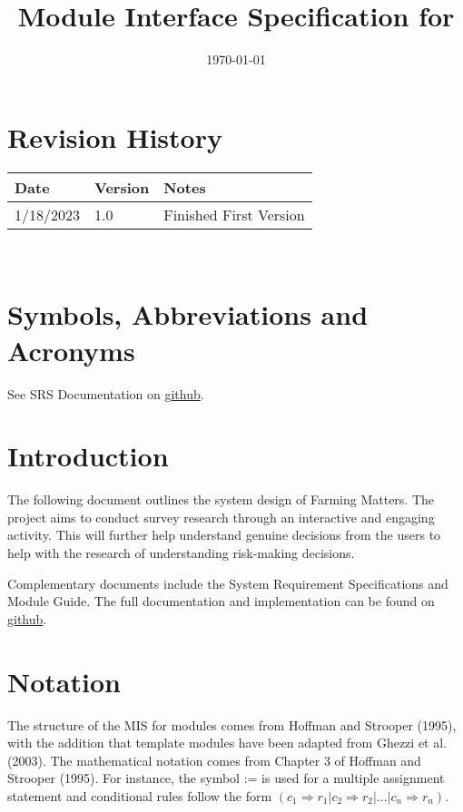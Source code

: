 \documentclass[12pt, titlepage]{article}
\begin{document}
\title{Module Interface Specification for \progname{}}

\author{\authname}

\date{\today}

\maketitle


\section{Revision History}

\begin{tabularx}{\textwidth}{p{3cm}p{2cm}X}
\toprule {\bf Date} & {\bf Version} & {\bf Notes}\\
\midrule
1/18/2023 & 1.0 & Finished First Version\\
\bottomrule
\end{tabularx}

~\newpage

\section{Symbols, Abbreviations and Acronyms}

See SRS Documentation on \href{https://github.com/brandonduong/Farming-Matters/blob/main/docs/SRS/SRS.pdf}{github}.

\newpage

\tableofcontents

\newpage


\section{Introduction}

The following document outlines the system design of Farming Matters. The project aims to conduct survey research through an interactive and engaging activity. This will further help understand genuine decisions from the users to help with the research of understanding risk-making decisions. 

Complementary documents include the System Requirement Specifications
and Module Guide.  The full documentation and implementation can be 
found on \href{https://github.com/brandonduong/Farming-Matters}{github}.

\section{Notation}
The structure of the MIS for modules comes from Hoffman and Strooper (1995),
with the addition that template modules have been adapted from
Ghezzi et al. (2003).  The mathematical notation comes from Chapter 3 of
Hoffman and Strooper (1995).  For instance, the symbol := is used for a
multiple assignment statement and conditional rules follow the form $(c_1
\Rightarrow r_1 | c_2 \Rightarrow r_2 | ... | c_n \Rightarrow r_n )$.
\end{document}
